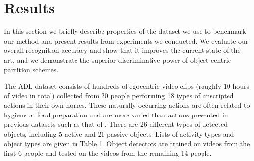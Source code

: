 \documentclass{bmvc2k}
\begin{document}
\section{Results}
  In this section we briefly describe properties of the dataset we use to
  benchmark our method and present results from experiments we conducted. We
  evaluate our overall recognition accuracy and show that it improves the
  current state of the art, and we demonstrate the superior discriminative
  power of object-centric partition schemes.

  The ADL dataset consists of hundreds of egocentric video clips
	(roughly 10 hours of video in total) collected from 20 people performing
	18 types of unscripted actions in their own homes. These naturally
  occurring
  actions are often related to hygiene or food preparation and are more
  varied than actions presented in previous datasets such as that of \cite{Fathi11}.
  There are 26 different 
	types of detected objects, including 5 active and 21 passive objects. 
  Lists of activity types and object types are given in Table 1.
  Object detectors are trained on videos from the
  first 6 people and tested on the videos from the remaining 14 people.
\end{document}
